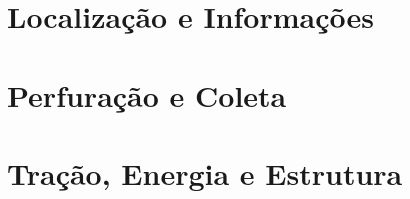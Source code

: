   
  
 
  \section{Localização e Informações}

  \section{Perfuração e Coleta}

  \section{Tração, Energia e Estrutura}
